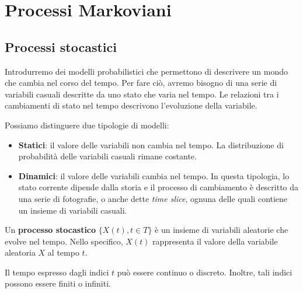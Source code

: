 \chapter{Processi Markoviani}
\section{Processi stocastici}
Introdurremo dei modelli probabilistici che permettono di descrivere un mondo
che cambia nel corso del tempo. Per fare ciò, avremo bisogno di una serie di
variabili casuali descritte da uno stato che varia nel tempo. Le relazioni tra i
cambiamenti di stato nel tempo descrivono l'evoluzione della variabile.

Possiamo distinguere due tipologie di modelli:
\begin{itemize}
    \item \textbf{Statici}: il valore delle variabili non cambia nel tempo. La 
            distribuzione di probabilità delle variabili casuali rimane costante.
    \item \textbf{Dinamici}: il valore delle variabili cambia nel tempo. In questa
          tipologia, lo stato corrente dipende dalla storia e il processo di
          cambiamento è descritto da una serie di fotografie, o anche dette
          \textit{time slice}, ognuna delle quali contiene un insieme di variabili
          casuali.
\end{itemize}
\begin{definizione}
    Un \textbf{processo stocastico} $\{X(t), t\in T\}$ è un insieme di variabili
    aleatorie che evolve nel tempo. Nello specifico, $X(t)$ rappresenta il valore
    della variabile aleatoria $X$ al tempo $t$.
\end{definizione}
Il tempo espresso dagli indici $t$ può essere continuo o discreto. Inoltre, tali
indici possono essere finiti o infiniti.

